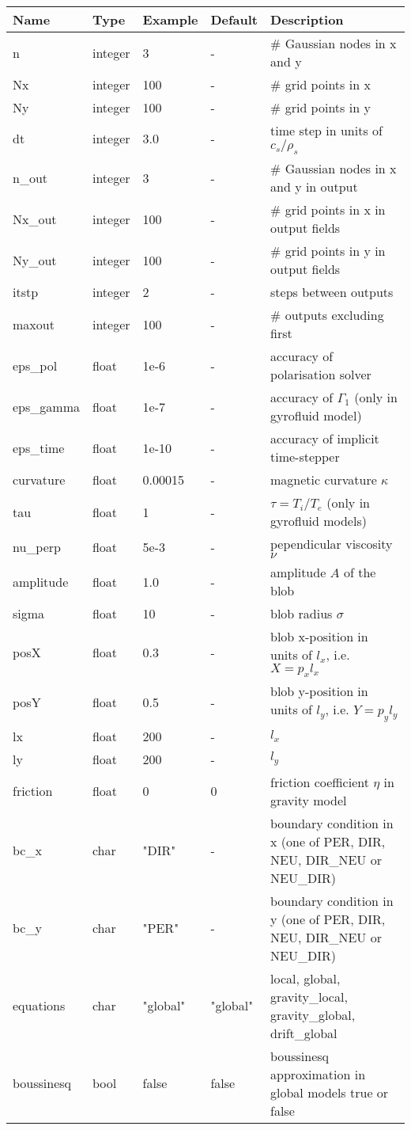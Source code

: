 \begin{longtable}{llll>{\RaggedRight}p{7cm}}
\toprule
\rowcolor{gray!50}\textbf{Name} &  \textbf{Type} & \textbf{Example} & \textbf{Default} & \textbf{Description}  \\ \midrule
n      & integer & 3 & - &\# Gaussian nodes in x and y \\
Nx     & integer &100& - &\# grid points in x \\
Ny     & integer &100& - &\# grid points in y \\
dt     & integer &3.0& - &time step in units of $c_s/\rho_s$ \\
n\_out  & integer &3  & - &\# Gaussian nodes in x and y in output \\
Nx\_out & integer &100& - &\# grid points in x in output fields \\
Ny\_out & integer &100& - &\# grid points in y in output fields \\
itstp  & integer &2  & - &   steps between outputs \\
maxout & integer &100& - &      \# outputs excluding first \\
eps\_pol   & float &1e-6    & - &  accuracy of polarisation solver \\
eps\_gamma & float &1e-7    & - & accuracy of $\Gamma_1$ (only in gyrofluid model) \\
eps\_time  & float &1e-10   & - & accuracy of implicit time-stepper \\
curvature  & float &0.00015& - & magnetic curvature $\kappa$ \\
tau        & float &1      & - & $\tau = T_i/T_e$ (only in gyrofluid models) \\
nu\_perp    & float &5e-3   & - & pependicular viscosity $\nu$ \\
amplitude  & float &1.0    & - & amplitude $A$ of the blob \\
sigma      & float &10     & - & blob radius $\sigma$ \\
posX       & float &0.3    & - & blob x-position in units of $l_x$, i.e. $X = p_x l_x$\\
posY       & float &0.5    & - & blob y-position in units of $l_y$, i.e. $Y = p_y l_y$ \\
lx         & float &200    & - & $l_x$  \\
ly         & float &200    & - & $l_y$  \\
friction   & float & 0     & 0 & friction coefficient $\eta$ in gravity model \\
bc\_x   & char & "DIR"      & - & boundary condition in x (one of PER, DIR, NEU, DIR\_NEU or NEU\_DIR) \\
bc\_y   & char & "PER"      & - & boundary condition in y (one of PER, DIR, NEU, DIR\_NEU or NEU\_DIR) \\
equations  & char & "global" & "global" &local, global, gravity\_local, gravity\_global, drift\_global \\
boussinesq & bool & false    & false &boussinesq approximation in global models true or false\\
\bottomrule
\end{longtable}

